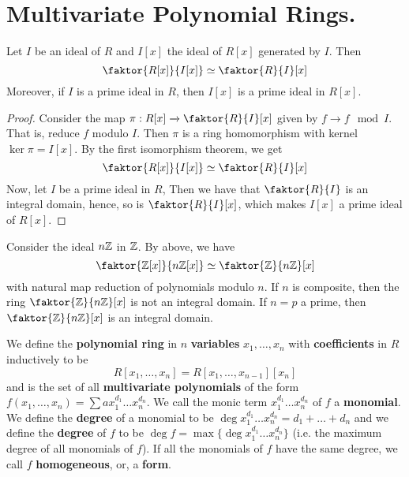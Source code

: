 \section{Multivariate Polynomial Rings.}

\begin{theorem}\label{3.1.1}
    Let $I$ be an ideal of  $R$ and  $I[x]$ the ideal of $R[x]$ generated by
    $I$. Then
    \begin{equation*}
        \faktor{R[x]}{I[x]} \simeq \faktor{R}{I}[x]
    \end{equation*}
    Moreover, if $I$ is a prime ideal in $R$, then $I[x]$ is a prime ideal in
    $R[x]$.
\end{theorem}
\begin{proof}
    Consider the map $\pi:R[x] \xrightarrow{} \faktor{R}{I}[x]$ given by $f
    \xrightarrow{} f \mod{I}$. That is, reduce $f$ modulo  $I$.  Then $\pi$ is a
    ring homomorphism with kernel $\ker{\pi}=I[x]$. By the first isomorphism
    theorem, we get
    \begin{equation*}
        \faktor{R[x]}{I[x]} \simeq \faktor{R}{I}[x]
    \end{equation*}
    Now, let $I$ be a prime ideal in $R$, Then we have that $\faktor{R}{I}$ is
    an integral domain, hence, so is $\faktor{R}{I}[x]$, which makes $I[x]$ a
    prime ideal of $R[x]$.
\end{proof}

\begin{example}\label{3.1}
    Consider the ideal $n\mathbb{Z}$ in  $\mathbb{Z}$. By above, we have
    \begin{equation*}
        \faktor{\Z[x]}{n\Z[x]} \simeq \faktor{\Z}{n\Z}[x]
    \end{equation*}
    with natural map reduction of polynomials modulo $n$. If $n$ is composite,
    then the ring $\faktor{\Z}{n\Z}[x]$ is not an integral domain. If $n=p$ a
    prime, then  $\faktor{\Z}{n\Z}[x]$ is an integral domain.
\end{example}

\begin{definition}
    We define the \textbf{polynomial ring} in $n$  \textbf{variables} $x_1,
    \dots, x_n$ with \textbf{coefficients} in $R$ inductively to be
    \begin{equation*}
        R[x_1, \dots, x_n]=R[x_1, \dots, x_{n-1}][x_n]
    \end{equation*}
    and is the set of all \textbf{multivariate polynomials} of the form $f(x_1,
    \dots,x_n)=\sum{ax_1^{d_1} \dots x_n^{d_n}}$. We call the monic term
    $x_1^{d_1} \dots x_n^{d_n}$ of $f$ a  \textbf{monomial}. We define the
    \textbf{degree} of a monomial to be $\deg{x_1^{d_1} \dots
    x_n^{d_n}}=d_1+\dots+d_n$ and we define the \textbf{degree} of $f$ to be
    $\deg{f}=\max{\{\deg{x_1^{d_1} \dots x_n^{d_n}}\}}$ (i.e. the maximum degree
    of all monomials of $f$). If all the monomials of $f$ have the same degree,
    we call  $f$  \textbf{homogeneous}, or, a \textbf{form}.
\end{definition}

